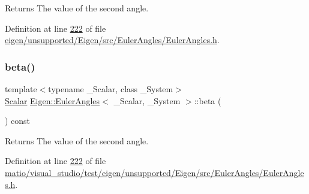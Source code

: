 \begin{DoxyReturn}{Returns}
The value of the second angle. 
\end{DoxyReturn}


Definition at line \hyperlink{eigen_2unsupported_2_eigen_2src_2_euler_angles_2_euler_angles_8h_source_l00222}{222} of file \hyperlink{eigen_2unsupported_2_eigen_2src_2_euler_angles_2_euler_angles_8h_source}{eigen/unsupported/\+Eigen/src/\+Euler\+Angles/\+Euler\+Angles.\+h}.

\mbox{\label{class_eigen_1_1_euler_angles_a1bf59f8acaed985964c98c1f59d8f5ab}} 
\subsubsection{\texorpdfstring{beta()}{beta()}\hspace{0.1cm}{\footnotesize\ttfamily [2/4]}}
{\footnotesize\ttfamily template$<$typename \+\_\+\+Scalar, class \+\_\+\+System$>$ \\
\hyperlink{class_eigen_1_1_euler_angles_a2ab1d433ac9683268446f8905ac31aac}{Scalar} \hyperlink{class_eigen_1_1_euler_angles}{Eigen\+::\+Euler\+Angles}$<$ \+\_\+\+Scalar, \+\_\+\+System $>$\+::beta (\begin{DoxyParamCaption}{ }\end{DoxyParamCaption}) const\hspace{0.3cm}{\ttfamily [inline]}}

\begin{DoxyReturn}{Returns}
The value of the second angle. 
\end{DoxyReturn}


Definition at line \hyperlink{matio_2visual__studio_2test_2eigen_2unsupported_2_eigen_2src_2_euler_angles_2_euler_angles_8h_source_l00222}{222} of file \hyperlink{matio_2visual__studio_2test_2eigen_2unsupported_2_eigen_2src_2_euler_angles_2_euler_angles_8h_source}{matio/visual\+\_\+studio/test/eigen/unsupported/\+Eigen/src/\+Euler\+Angles/\+Euler\+Angles.\+h}.

\mbox{\label{class_eigen_1_1_euler_angles_a2db042cfba5486d46fdeb77fecd8e509}} 
